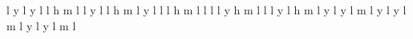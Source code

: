 {{{             \xxmax\space \ymin \space l
             \xmax \space \ymin \space \xmax \space \yymin\space y
             \xmax \space \yymax\space l
             \xmax \space \ymax \space \xxmax\space \ymax \space y
             \xmin \space \ymax \space l
             \xmin \space \ymin\space l
             h
           \or %
             \xmin \space \ymin \space m
             \xmax \space \ymin \space l
             \xmax \space \yymax\space l
             \xmax \space \ymax \space \xxmax\space \ymax \space y
             \xmin \space \ymax \space l
             \xmin \space \ymin \space l
             h
           \or %
             \xmin \space \ymin \space m
             \xxmax\space \ymin \space l
             \xmax \space \ymin \space \xmax \space \yymin\space y
             \xmax \space \ymax \space l
             \xmin \space \ymax \space l
             \xmin \space \ymin \space l
             h
           \or
             \xxmin\space \ymin \space m
             \xmax \space \ymin \space l
             \xmax \space \ymax \space l
             \xmin \space \ymax \space l
             \xmin \space \yymin\space l
             \xmin \space \ymin \space \xxmin\space \ymin \space y
             h
           \or
             \xmin \space \ymin \space m
             \xmax \space \ymin \space l
             \xmax \space \ymax \space l
             \xxmin\space \ymax \space l
             \xmin \space \ymax \space \xmin \space \yymax\space y
             \xmin \space \ymin \space l
             h
           \or %
             \xmin \space \ymax \space m
             \xmin \space \yymin\space l
             \xmin \space \ymin \space \xxmin\space \ymin \space y
             \xxmax\space \ymin \space l
             \xmax \space \ymin \space \xmax \space \yymin\space y
             \xmax \space \ymax \space l
           \or %
             \xmax \space \ymax \space m
             \xxmin\space \ymax \space l
             \xmin \space \ymax \space \xmin \space \yymax\space y
             \xmin \space \yymin\space l
             \xmin \space \ymin \space \xxmin\space \ymin \space y
             \xmax\space  \ymin \space l
           \or %
             \xmax \space \ymin \space m
             \xmax \space \yymax\space l
             \xmax \space \ymax \space \xxmax \space \ymax\space y
             \xxmin\space \ymax \space l
             \xmin \space \ymax \space \xmin \space \yymax\space y
             \xmin \space \ymin \space l
           \or %
             \xmin \space \ymax \space m
             \xxmax\space \ymax \space l
}}}
